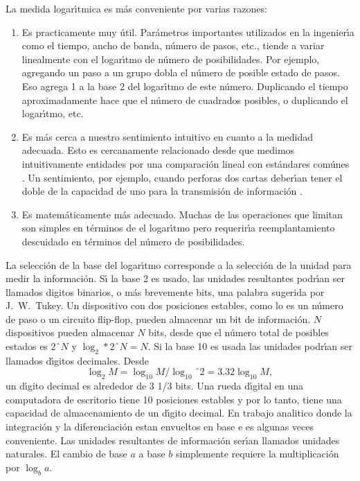 La medida logar\'{\i}tmica es m\'{a}s conveniente por varias razones:
\begin{enumerate}
\item{Es practicamente muy \'{u}til. Par\'{a}metros importantes utilizados en la
ingenier\'{\i}a como el tiempo, ancho de banda, n\'{u}mero de pasos,
etc., tiende a variar linealmente con el logar\'{\i}tmo de n\'{u}mero
de posibilidades. Por ejemplo, agregando un paso a un grupo dobla el
n\'{u}mero de posible estado de pasos. Eso agrega 1 a la base 2 del
logar\'{\i}tmo de este n\'{u}mero. Duplicando el tiempo
aproximadamente hace que el n\'{u}mero de cuadrados posibles, o
duplicando el logar\'{\i}tmo, etc.}
\item{Es m\'{a}s cerca a nuestro sentimiento intuitivo en cuanto a la medidad
adecuada. Esto es cercanamente relacionado desde que medimos
intuitivamente entidades por una comparaci\'{o}n lineal con est\'{a}ndares
com\'{u}nes \cite{FALTA}. Un sentimiento, por ejemplo, cuando perforas
dos cartas deber\'{\i}an tener el doble de la capacidad de uno para la
transmisi\'{o}n de informaci\'{o}n \cite{FALTA}.}
\item{Es matem\'{a}ticamente m\'{a}s adecuado. Muchas de las operaciones que
limitan son simples en t\'{e}rminos de el logar\'{\i}tmo pero requerir\'{\i}a
reemplantamiento descuidado en t\'{e}rminos del n\'{u}mero de posibilidades.}
\end{enumerate}

La selecci\'{o}n de la base del logar\'{\i}tmo corresponde a la
selecci\'{o}n de la unidad para medir la informaci\'{o}n. S\'{\i} la
base 2 es usado, las unidades resultantes podr\'{\i}an ser llamados
digitos binarios, o m\'{a}s brevemente bits, una palabra sugerida por
J.\ W.\ Tukey. Un dispositivo con dos posiciones estables, como lo es
un n\'{u}mero de paso o un circuito flip-flop, pueden almacenar un bit
de informaci\'{o}n. $N$ dispositivos pueden almacenar $N$ bits, desde
que el n\'{u}mero total de posibles estados es $2ˆN$ y $\log_2 * 2ˆN =
N$. Si la base 10 es usada las unidades podr\'{\i}an ser llamados
d\'{\i}gitos decimales. Desde
\begin{equation}
\log_2 M = \log_10 M / \log_10ˆ2 = 3.32 \log_10 M,
\end{equation}
un d\'{\i}gito decimal es alrededor de 3 1/3
bits. Una rueda d\'{\i}gital en una computadora de escritorio tiene 10
posiciones estables y por lo tanto, tiene una capacidad de
almacenamiento de un d\'{\i}gito decimal. En trabajo analitico donde
la integraci\'{o}n y la diferenciaci\'{o}n estan envueltos en base e
es algunas veces conveniente. Las unidades resultantes de
informaci\'{o}n ser\'{\i}an llamados unidades naturales. El cambio de
base $a$ a base $b$ simplemente requiere la multiplicaci\'{o}n por
$\log_b a$.

